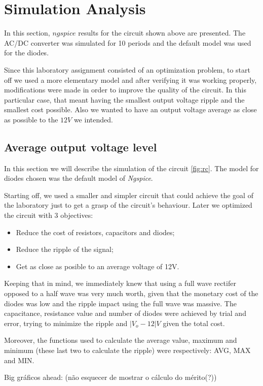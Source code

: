 \section{Simulation Analysis}
\label{sec:simulation}
In this section, $ngspice$ results for the circuit shown above are presented. The AC/DC converter was simulated for 10 periods and the default model was used for the diodes.

Since this laboratory assignment consisted of an optimization problem, to start off we used a more elementary model and after verifying it was working properly, modifications were made in order to improve the quality of the circuit. In this particular case, that meant having the smallest output voltage ripple and the smallest cost possible. Also we wanted to have an output voltage average as close as possible to the $12 V$ we intended.


\subsection{Average output voltage level}
In this section we will describe the simulation of the circuit \ref{fig:rc}.
The model for diodes chosen was the default model of \emph{Ngspice}.

Starting off, we used a smaller and simpler circuit that could achieve
the goal of the laboratory just to get a grasp of the circuit's behaviour.
Later we optimized the circuit with 3 objectives:
\begin{itemize}
  \item Reduce the cost of resistors, capacitors and diodes;
  \item Reduce the ripple of the signal;
  \item Get as close as posible to an average voltage of 12V.
\end{itemize}
Keeping that in mind, we immediately knew that using a full wave rectifer opposed to a half wave
was very much worth, given that the monetary cost of the diodes was low and the ripple impact using the full wave was massive.
The capacitance, resistance value and number of diodes were achieved by trial and error, trying to minimize the
ripple and $|V_{o}-12|V$ given the total cost.

Moreover, the functions used to calculate the average value, maximum and minimum (these last two to calculate the ripple)
were respectively: AVG, MAX and MIN.

Big gráficos ahead: (não esquecer de mostrar o cálculo do mérito(?))

